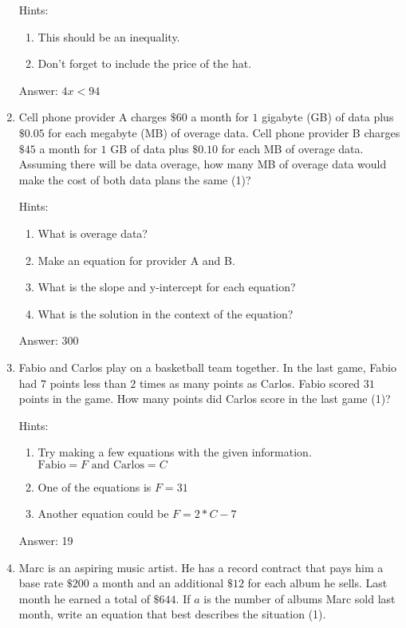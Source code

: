 \documentclass{article}
\begin{document}
\begin{enumerate}
{	      Hints:
	      \begin{enumerate}
		      \item {This should be an inequality.}
		      \item {Don't forget to include the price of the hat.}
	      \end{enumerate}

	      Answer: \(4x < 94\)}
	\item {Cell phone provider A charges $\$60$ a month for $1$ gigabyte (GB) of data plus $\$0.05$ for each megabyte (MB) of overage data. Cell phone provider B charges $\$45$ a month for $1$ GB of data plus $\$0.10$ for each MB of overage data. Assuming there will be data overage, how many MB of overage data would make the cost of both data plans the same (1)?

		      Hints:
		      \begin{enumerate}
			      \item {What is overage data?}
			      \item {Make an equation for provider A and B.}
			      \item {What is the slope and y-intercept for each equation?}
			      \item {What is the solution in the context of the equation?}
		      \end{enumerate}

		      Answer: $300$
	      }


	\item {Fabio and Carlos play on a basketball team together. In the last game, Fabio had $7$ points less than $2$ times as many points as Carlos. Fabio scored $31$ points in the game. How many points did Carlos score in the last game (1)?

	      Hints:
	      \begin{enumerate}
		      \item {Try making a few equations with the given information. \(\text{Fabio}=F\text{ and Carlos}=C\)}
		      \item {One of the equations is \(F=31\)}
		      \item {Another equation could be \(F=2*C-7\)}
	      \end{enumerate}

	      Answer: 19
	      }

	\item {Marc is an aspiring music artist. He has a record contract that pays him a base rate $\$200$ a month and an additional $\$12$ for each album he sells. Last month he earned a total of $\$644$. If $a$ is the number of albums Marc sold last month, write an equation that best describes the situation (1).

}
\end{enumerate}
\end{document}
